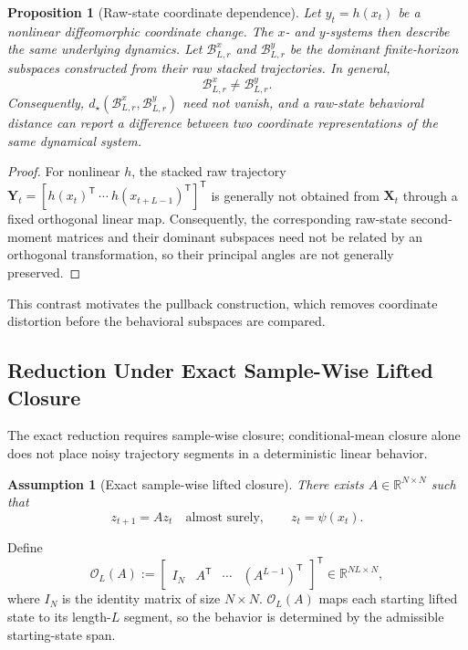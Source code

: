 \documentclass[letterpaper, 10 pt, conference]{ieeeconf}  %
\newtheorem{assumption}{Assumption}
\newtheorem{proposition}{Proposition}
\newcommand{\R}{\mathbb{R}}
\newcommand{\T}{^{\mathsf T}}
\begin{document}
\begin{proposition}[Raw-state coordinate dependence]
\label{thm:stoch_noninvariance_raw}
Let $y_t=h(x_t)$ be a nonlinear diffeomorphic coordinate change. The $x$- and $y$-systems then describe the same underlying dynamics. Let $\mathcal B^{x}_{L,r}$ and $\mathcal B^{y}_{L,r}$ be the dominant finite-horizon subspaces constructed from their raw stacked trajectories. In general,
\[
  \mathcal B^{x}_{L,r}\neq\mathcal B^{y}_{L,r}.
\]
Consequently, $d_\star(\mathcal B^{x}_{L,r},\mathcal B^{y}_{L,r})$ need not vanish, and a raw-state behavioral distance can report a difference between two coordinate representations of the same dynamical system.
\end{proposition}

\begin{proof}
For nonlinear $h$, the stacked raw trajectory $\mathbf Y_t=[h(x_t)\T\ \cdots\ h(x_{t+L-1})\T]\T$ is generally not obtained from $\mathbf X_t$ through a fixed orthogonal linear map. Consequently, the corresponding raw-state second-moment matrices and their dominant subspaces need not be related by an orthogonal transformation, so their principal angles are not generally preserved.
\end{proof}

This contrast motivates the pullback construction, which removes coordinate distortion before the behavioral subspaces are compared.



\subsection{Reduction Under Exact Sample-Wise Lifted Closure}
\label{sec:reduction}

The exact reduction requires sample-wise closure; conditional-mean closure alone does not place noisy trajectory segments in a deterministic linear behavior.

\begin{assumption}[Exact sample-wise lifted closure]
\label{ass:koopman_closure_stochastic}
There exists $A\in\R^{N\times N}$ such that
\begin{equation}
  z_{t+1}=Az_t\quad\text{almost surely},\qquad z_t=\psi(x_t).
  \label{eq:stochastic_koopman_closure}
\end{equation}
\end{assumption}
Define
\begin{equation}
  \mathcal O_L(A):=\begin{bmatrix}I_N&A\T&\cdots&(A^{L-1})\T\end{bmatrix}\T
  \in\R^{NL\times N},
  \label{eq:finite_horizon_lifting_matrix}
\end{equation}
where $I_N$ is the identity matrix of size $N \times N$. $\mathcal O_L(A)$ maps each starting lifted state to its length-$L$ segment, so the behavior is determined by the admissible starting-state span.
\end{document}
